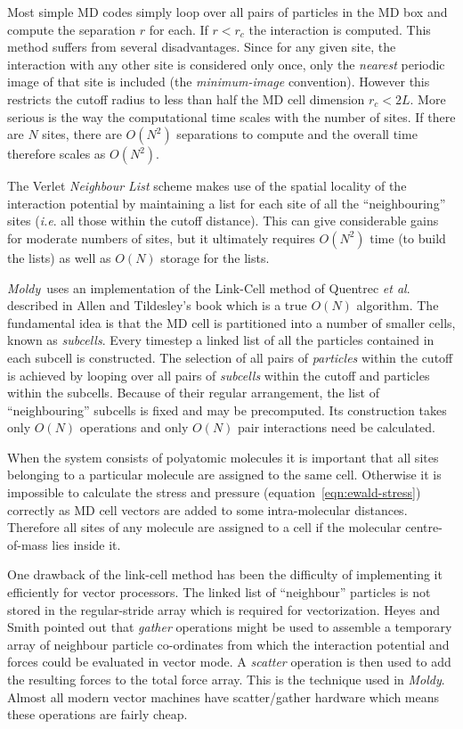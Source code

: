 \documentclass[twoside]{report}
\newcommand{\moldy}{{\em Moldy}}
\begin{document}
Most simple MD codes simply loop over all pairs of particles in the MD
box and compute the separation $r$ for each.  If $r < r_c$ the
interaction is computed.  This method suffers from several
disadvantages.  Since for any given site, the interaction with any
other site is considered only once, only the {\em nearest\/} periodic
image of that site is included (the {\em minimum-image\/} convention).
However this restricts the cutoff radius to less than half the MD cell
dimension $r_c < 2L$.  More serious is the way the computational
time scales with the number of sites.  If there are $N$ sites, there
are $O(N^2)$ separations to compute and the overall time therefore scales
as $O(N^2)$.

The Verlet {\em Neighbour List\/} scheme\cite[pp 146-149]{allen:87} makes
use of the spatial locality of the interaction potential by
maintaining a list for each site of all the ``neighbouring'' sites
({\em i.e}. all those within the cutoff distance).  This can give
considerable gains for moderate numbers of sites, but it ultimately
requires $O(N^2)$ time (to build the lists) as well as $O(N)$ storage for
the lists.

\moldy\ uses an implementation of the Link-Cell method of Quentrec {\em
et al}.\cite{quentrec:75} described in Allen and Tildesley's 
book\cite[pp 149-152]{allen:87} which is a true $O(N)$ algorithm.  
The fundamental idea is that the MD cell is partitioned into a number
of smaller cells, known as {\em subcells}.  Every timestep a linked
list of all the particles contained in each subcell is constructed.
The selection of all pairs of {\em particles\/} within the cutoff is
achieved by looping over all pairs of {\em subcells\/} within the cutoff
and particles within the subcells.  Because of their regular
arrangement, the list of ``neighbouring'' subcells is fixed and may be
precomputed.  Its construction takes only $O(N)$ operations and only
$O(N)$ pair interactions need be calculated.


When the system consists of polyatomic molecules it is important that
all sites belonging to a particular molecule are assigned to the same
cell.  Otherwise it is impossible to calculate the stress and pressure
(equation~\ref{eqn:ewald-stress}) correctly as MD cell vectors are
added to some intra-molecular distances.  Therefore all sites of any
molecule are assigned to a cell if the molecular centre-of-mass lies
inside it.

One drawback of the link-cell method has been the difficulty of
implementing it efficiently for vector processors.  The linked list of
``neighbour'' particles is not stored in the regular-stride array
which is required for vectorization.  Heyes and Smith\cite{heyes:87}
pointed out that {\em gather\/} operations might be used to assemble a
temporary array of neighbour particle co-ordinates from which the
interaction potential and forces could be evaluated in vector mode.  A
{\em scatter\/} operation is then used to add the resulting forces to
the total force array.  This is the technique used in \moldy.  Almost
all modern vector machines have scatter/gather hardware which means
these operations are fairly cheap.
\end{document}
